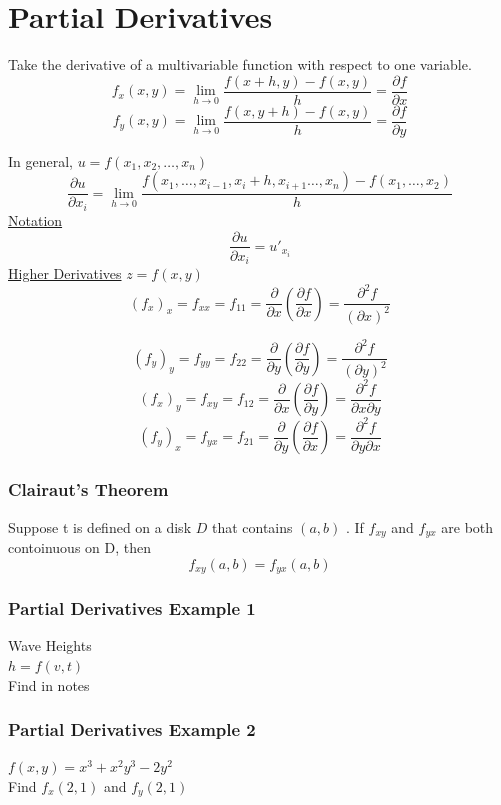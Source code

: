 \documentclass[12pt]{article}
\begin{document}
\section{Partial Derivatives}
Take the derivative of a multivariable function with respect to one variable.
\[
	f_x(x,y) = \lim_{h \to 0} \frac{f(x+h,y) - f(x,y)}{h} = \frac{\partial f}{\partial x}  
\]
\[
	f_y(x,y) = \lim_{h \to 0} \frac{f(x,y+h) - f(x,y)}{h} = \frac{\partial f}{\partial y} 
\]

In general, \(u=f(x_1,x_2,\hdots,x_n)\) 
\[
	\frac{\partial u}{\partial x_i}  = \lim_{h \to 0} \frac{f(x_1,\hdots,x_{i-1},x_i+h,x_{i+1}\hdots,x_n) - f(x_1,\hdots,x_2)}{h}
\]
\underline{Notation} \[
	\frac{\partial u}{\partial x_i} = u'_{x_i}
\]
\underline{Higher Derivatives} \(z=f(x,y)\) 
\[
	(f_x)_x = f_{x x} = f_{11} = \frac{\partial }{\partial x}(\frac{\partial f}{\partial x} ) = \frac{\partial^2f}{(\partial x)^2}  
\]

\[
	(f_y)_y = f_{y y} = f_{22} = \frac{\partial }{\partial y}(\frac{\partial f}{\partial y} ) = \frac{\partial^2f}{(\partial y)^2}  
\]
\[
	(f_x)_y = f_{x y} = f_{12} = \frac{\partial }{\partial x}(\frac{\partial f}{\partial y} ) = \frac{\partial^2f}{\partial x \partial y}  
\]
\[
	(f_y)_x = f_{y x} = f_{21} = \frac{\partial }{\partial y}(\frac{\partial f}{\partial x} ) = \frac{\partial^2f}{\partial y \partial x}  
\]

\subsubsection{Clairaut's Theorem}
Suppose t is defined on a disk \(D\) that contains \((a,b)\) . If \(f_{xy}\) and \(f_{yx}\) are both contoinuous on D, then \[
	f_{xy}(a,b) = f_{yx}(a,b)
\]
\subsubsection{Partial Derivatives Example 1}
Wave Heights\\
\(h=f(v,t)\) \\
Find in notes

\subsubsection{Partial Derivatives Example 2}
\(f(x,y) = x^3 + x^2y^3 - 2y^2\) \\
Find \(f_x(2,1)\) and \(f_y(2,1)\) 
\end{document}
